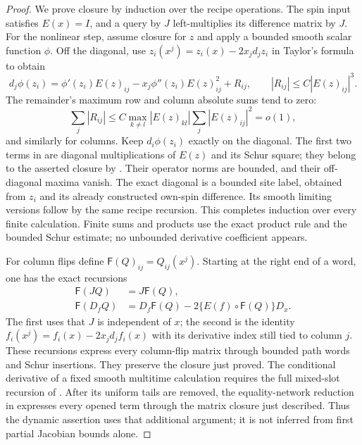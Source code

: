 \begin{proof}
We prove closure by induction over the recipe operations.  The spin
input satisfies $E(x)=I$, and a query by $J$ left-multiplies its
difference matrix by $J$.  For the nonlinear step, assume closure
for $z$ and apply a bounded smooth scalar function $\phi$.
Off the diagonal, use $z_i(x^j)=z_i(x)-2x_jd_jz_i$ in Taylor's
formula to obtain
\begin{equation}
 d_j\phi(z_i)
 =\phi'(z_i)E(z)_{ij}
       -x_j\phi''(z_i)E(z)_{ij}^2+R_{ij},
 \qquad |R_{ij}|\le C|E(z)_{ij}|^3.
 \label{eq:path-difference-taylor}
\end{equation}
The remainder's maximum row and column absolute sums tend to zero:
\[
 \sum_j|R_{ij}|
 \le C\max_{k\ne l}|E(z)_{kl}|\sum_j|E(z)_{ij}|^2=o(1),
\]
and similarly for columns.  Keep $d_i\phi(z_i)$ exactly on the
diagonal.  The first two terms in
 are diagonal multiplications of
$E(z)$ and its Schur square; they belong to the asserted closure by
.  Their operator norms are bounded, and
their off-diagonal maxima vanish.  The exact diagonal is a bounded
site label, obtained from $z_i$ and its already constructed own-spin
difference.  Its smooth limiting versions follow by the same recipe
recursion.  This completes induction over every finite calculation.
Finite sums and products use the exact product rule and the bounded
Schur estimate; no unbounded derivative coefficient appears.

For column flips define $\mathsf F(Q)_{ij}=Q_{ij}(x^j)$.
Starting at the right end of a word, one has the exact recursions
\begin{align*}
 \mathsf F(JQ)&=J\mathsf F(Q),\\
 \mathsf F(D_fQ)
 &=D_f\mathsf F(Q)-2\{E(f)\circ\mathsf F(Q)\}D_x.
\end{align*}
The first uses that $J$ is independent of $x$; the second is the
identity $f_i(x^j)=f_i(x)-2x_jd_jf_i(x)$ with its derivative index
still tied to column $j$.  These recursions express every column-flip
matrix through bounded path words and Schur insertions.  They preserve
the closure just proved.  The conditional derivative of a fixed smooth multitime calculation
requires the full mixed-slot recursion of
.
After its uniform tails are removed, the equality-network reduction
in  expresses every opened term
through the matrix closure just described.  Thus the dynamic assertion
uses that additional argument; it is not inferred from first partial
Jacobian bounds alone.
\end{proof}

